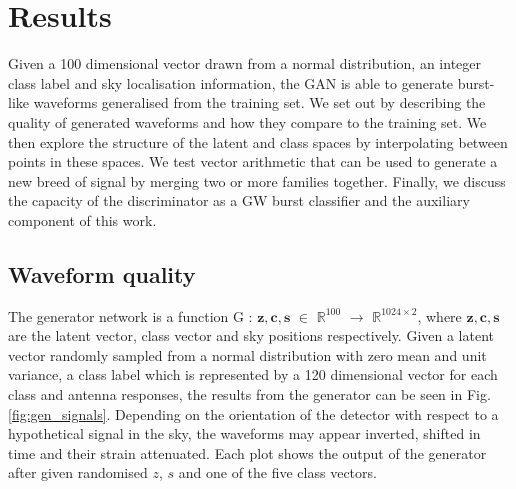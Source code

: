 \documentclass[12pt]{iopart}
\begin{document}
\section{Results}

Given a 100 dimensional vector drawn from a normal distribution, an integer class label and sky localisation information, the GAN is able to generate burst-like waveforms  generalised from the training set. We set out by describing the quality of generated waveforms and how they compare to the training set. We then explore the structure of the latent and class spaces by interpolating between points in these spaces. We test vector arithmetic that can be used to generate a new breed of signal by merging two or more families together. Finally, we discuss the capacity of the discriminator as a GW burst classifier and the auxiliary component of this work. 

\subsection{Waveform quality}
The generator network is a function G : $\mathbf{z},\mathbf{c},\mathbb{\textbf{s}}$ $\in$ $\mathbb{R}^{100}$ $\to$ $\mathbb{R}^{1024\times2}$, where $\mathbf{z},\mathbf{c},\mathbb{\textbf{s}}$ are the latent vector, class vector and sky positions respectively. Given a latent vector randomly sampled from a normal distribution with zero mean and unit variance, a class label which is represented by a 120 dimensional vector for each class and antenna responses, the results from the generator can be seen in Fig. \ref{fig:gen_signals}. Depending on the orientation of the detector with respect to a hypothetical signal in the sky, the waveforms may appear inverted, shifted in time and their strain attenuated. Each plot shows the output of the generator after given randomised $z$, $s$ and one of the five class vectors.
\end{document}
